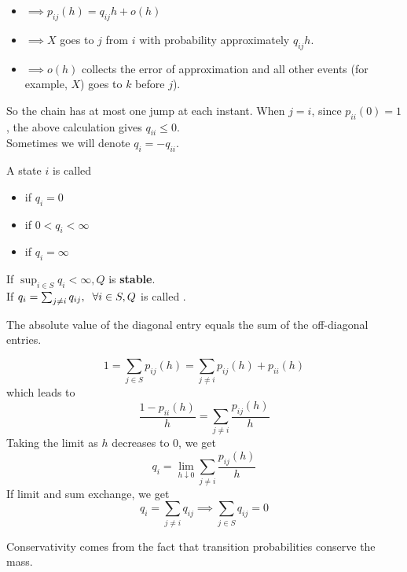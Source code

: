 \documentclass{article}
\begin{document}
	\begin{itemize}
		\item  $\implies p_{ij}(h)=q_{ij}h + o(h)$ 
		\item  $\implies X$ goes to $j$ from $i$ with probability approximately $q_{ij}h $.
		\item  $\implies o(h)$ collects the error of approximation and all other events (for example, $X$) goes to $k$ before $j$).
	\end{itemize}
	So the chain has at most one jump at each instant. When $j=i$, since $p_{ii}(0) = 1$, the above calculation gives $q_{ii} \leqslant 0$. \\
	Sometimes we will denote $q_i = - q_{ii}$.
	\begin{definition}
		A state $i$ is called
		\begin{itemize}
			\item {} if $q_i = 0$
			\item {} if $0 < q_i < \infty$
			\item {} if $q_i = \infty$ 
		\end{itemize}
		If $\sup_{i \in S} q_i < \infty, Q$ is \textbf{stable}. \\
		If $q_i = \sum_{j \neq i} q_{ij}, \hspace{0.2 cm} \forall i \in S, Q $ is called .     
	\end{definition}
	\begin{remark}
		The absolute value of the diagonal entry equals the sum of the off-diagonal entries.
	\end{remark}\begin{equation*}
		1 = \sum_{j \in S} p_{ij}(h) = \sum_{j \neq i} p_{ij}(h) + p_{ii}(h)
	\end{equation*}
	which leads to 
	\begin{equation*}
		\frac{1-p_{ii}(h)}{h} = \sum_{j \neq i} \frac{p_{ij}(h)}{h}
	\end{equation*}
	Taking the limit as $h$ decreases to $0$, we get
	\begin{equation*}
		q_i = \lim_{h \downarrow 0} \sum_{j \neq i} \frac{p_{ij}(h)}{h}
	\end{equation*}
	If limit and sum exchange, we get 
	\begin{equation*}
		q_i = \sum_{j \neq i} q_{ij} \implies \sum_{j \in S} q_{ij} = 0
	\end{equation*}
	\begin{remark}
		Conservativity comes from the fact that transition probabilities conserve the mass.
	\end{remark}
\end{document}

